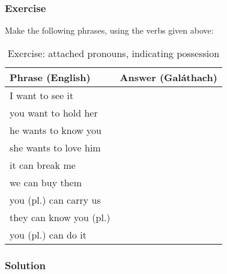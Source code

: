 \newpage
\subsubsection{Exercise}

Make the following phrases, using the verbs given above:
\begin{table}[H]
\centering
\begin{tabu}{|l|p{10.0cm}|}
  \toprule
  \textbf{Phrase (English)} & \textbf{Answer (Gal\'{a}thach)}\\
  \toprule
  I want to see it & \\
  \midrule
  you want to hold her & \\
  \midrule
  he wants to know you & \\
  \midrule
  she wants to love him & \\
  \midrule
  it can break me & \\
  \midrule
  we can buy them & \\
  \midrule
  you (pl.) can carry us & \\
  \midrule
  they can know you (pl.) & \\
  \midrule
  you (pl.) can do it & \\
  \bottomrule
\end{tabu}
\label{exercise_attached_pronouns_indicating_possession}
\caption{Exercise: attached pronouns, indicating possession}
\end{table}

\newpage
\subsubsection{Solution}
\begin{table}[H]
\centering
{}
\label{solution_attached_pronouns_indicating_possession}
\caption{Solution: attached pronouns, indicating possession}
\end{table}
